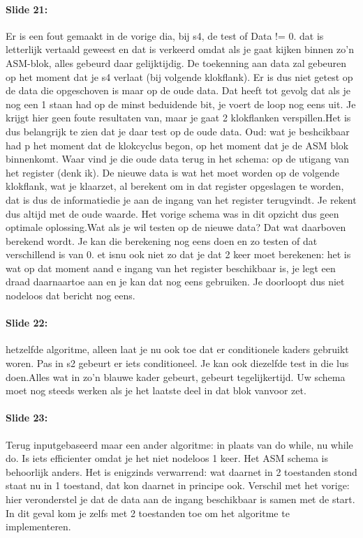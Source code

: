\documentclass[10pt,a4paper]{book}
\begin{document}
\paragraph{Slide 21:} Er is een fout gemaakt in de vorige dia, bij s4, de test of Data != 0. dat is letterlijk vertaald geweest en dat is verkeerd omdat als je gaat kijken binnen zo'n ASM-blok, alles gebeurd daar gelijktijdig. De toekenning aan data zal gebeuren op het moment dat je s4 verlaat (bij volgende klokflank). Er is dus niet getest op de data die opgeschoven is maar op de oude data. Dat heeft tot gevolg dat als je nog een 1 staan had op de minst beduidende bit, je voert de loop nog eens uit. Je krijgt hier geen foute resultaten van, maar je gaat 2 klokflanken verspillen.Het is dus belangrijk te zien dat je daar test op de oude data. Oud: wat je beshcikbaar had p het moment dat de klokcyclus begon, op het moment dat je de ASM blok binnenkomt. Waar vind je die oude data terug in het schema: op de utigang van het register (denk ik). De nieuwe data is wat het moet worden op de volgende klokflank, wat je klaarzet, al berekent om in dat register opgeslagen te worden, dat is dus de informatiedie je aan de ingang van het register terugvindt. Je rekent dus altijd met de oude waarde. Het vorige schema was in dit opzicht dus geen optimale oplossing.Wat als je wil testen op de nieuwe data? Dat wat daarboven berekend wordt. Je kan die berekening nog eens doen en zo testen of dat verschillend is van 0. et isnu ook niet zo dat je dat 2 keer moet berekenen: het is wat op dat moment aand e ingang van het register beschikbaar is, je legt een draad daarnaartoe aan en je kan dat nog eens gebruiken. Je doorloopt dus niet nodeloos dat bericht nog eens.

\paragraph{Slide 22:} hetzelfde algoritme, alleen laat je nu ook toe dat er conditionele kaders gebruikt woren. Pas in s2 gebeurt er iets conditioneel. Je kan ook diezelfde test in die lus doen.Alles wat in zo'n blauwe kader gebeurt, gebeurt tegelijkertijd. Uw schema moet nog steeds werken als je het laatste deel in dat blok vanvoor zet. 

\paragraph{Slide 23:} Terug inputgebaseerd maar een ander algoritme: in plaats van do while, nu while do. Is iets efficienter omdat je het niet nodeloos 1 keer. Het ASM schema is behoorlijk anders. Het is enigzinds verwarrend: wat daarnet in 2 toestanden stond staat nu in 1 toestand, dat kon daarnet in principe ook. Verschil met het vorige: hier veronderstel je dat de data aan de ingang beschikbaar is samen met de start. In dit geval kom je zelfs met 2 toestanden toe om het algoritme te implementeren.
\end{document}
